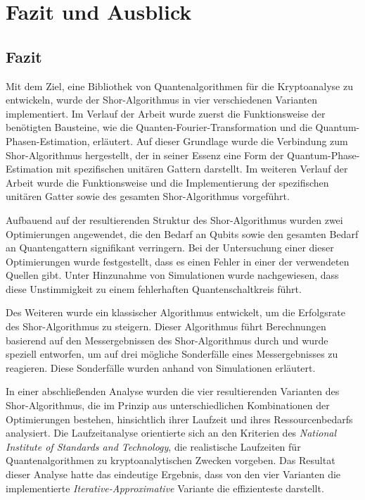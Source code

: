 \section{Fazit und Ausblick}
\subsection*{Fazit}
Mit dem Ziel, eine Bibliothek von Quantenalgorithmen für die Kryptoanalyse zu entwickeln, 
wurde der Shor-Algorithmus in vier verschiedenen Varianten implementiert. 
Im Verlauf der Arbeit wurde zuerst die Funktionsweise der benötigten Bausteine, 
wie die Quanten-Fourier-Transformation und die Quantum-Phasen-Estimation, erläutert. 
Auf dieser Grundlage wurde die Verbindung zum Shor-Algorithmus hergestellt, 
der in seiner Essenz eine Form der Quantum-Phase-Estimation mit spezifischen unitären Gattern darstellt. 
Im weiteren Verlauf der Arbeit wurde die Funktionsweise und die Implementierung der spezifischen unitären Gatter 
sowie des gesamten Shor-Algorithmus vorgeführt. 

Aufbauend auf der resultierenden Struktur des Shor-Algorithmus wurden zwei Optimierungen angewendet, 
die den Bedarf an Qubits sowie den gesamten Bedarf an Quantengattern signifikant verringern. 
Bei der Untersuchung einer dieser Optimierungen wurde festgestellt, 
dass es einen Fehler in einer der verwendeten Quellen gibt. 
Unter Hinzunahme von Simulationen wurde nachgewiesen, 
dass diese Unstimmigkeit zu einem fehlerhaften Quantenschaltkreis führt.

Des Weiteren wurde ein klassischer Algorithmus entwickelt, 
um die Erfolgsrate des Shor-Algorithmus zu steigern. 
Dieser Algorithmus führt Berechnungen basierend auf den Messergebnissen des Shor-Algorithmus durch und wurde speziell entworfen, 
um auf drei mögliche Sonderfälle eines Messergebnisses zu reagieren. Diese Sonderfälle wurden anhand von Simulationen erläutert.

In einer abschließenden Analyse wurden die vier resultierenden Varianten des Shor-Algorithmus, 
die im Prinzip aus unterschiedlichen Kombinationen der Optimierungen bestehen, 
hinsichtlich ihrer Laufzeit und ihres Ressourcenbedarfs analysiert. 
Die Laufzeitanalyse orientierte sich an den Kriterien des \textit{National Institute of Standards and Technology}, 
die realistische Laufzeiten für Quantenalgorithmen zu kryptoanalytischen Zwecken vorgeben.
Das Resultat dieser Analyse hatte das eindeutige Ergebnis, 
dass von den vier Varianten die implementierte \textit{Iterative-Approximative} Variante die effizienteste darstellt.

